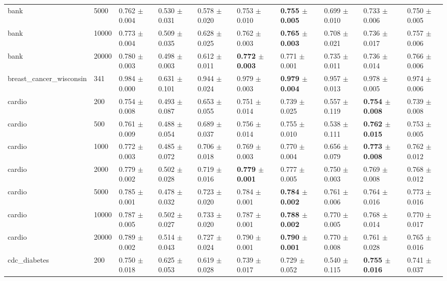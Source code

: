 \begin{table}
\begin{tabular}{llllllllll}
bank & 5000 & 0.762 $\pm$ 0.004 & 0.530 $\pm$ 0.031 & 0.578 $\pm$ 0.020 & 0.753 $\pm$ 0.010 & \textbf{0.755 $\pm$ 0.005} & 0.699 $\pm$ 0.010 & 0.733 $\pm$ 0.006 & 0.750 $\pm$ 0.005 \\
bank & 10000 & 0.773 $\pm$ 0.004 & 0.509 $\pm$ 0.035 & 0.628 $\pm$ 0.025 & 0.762 $\pm$ 0.003 & \textbf{0.765 $\pm$ 0.003} & 0.708 $\pm$ 0.021 & 0.736 $\pm$ 0.017 & 0.757 $\pm$ 0.006 \\
bank & 20000 & 0.780 $\pm$ 0.003 & 0.498 $\pm$ 0.003 & 0.612 $\pm$ 0.011 & \textbf{0.772 $\pm$ 0.003} & 0.771 $\pm$ 0.001 & 0.735 $\pm$ 0.011 & 0.736 $\pm$ 0.014 & 0.766 $\pm$ 0.006 \\
breast\_cancer\_wisconsin & 341 & 0.984 $\pm$ 0.000 & 0.631 $\pm$ 0.101 & 0.944 $\pm$ 0.024 & 0.979 $\pm$ 0.003 & \textbf{0.979 $\pm$ 0.004} & 0.957 $\pm$ 0.013 & 0.978 $\pm$ 0.005 & 0.974 $\pm$ 0.006 \\
cardio & 200 & 0.754 $\pm$ 0.008 & 0.493 $\pm$ 0.087 & 0.653 $\pm$ 0.055 & 0.751 $\pm$ 0.014 & 0.739 $\pm$ 0.025 & 0.557 $\pm$ 0.119 & \textbf{0.754 $\pm$ 0.008} & 0.739 $\pm$ 0.008 \\
cardio & 500 & 0.761 $\pm$ 0.009 & 0.488 $\pm$ 0.054 & 0.689 $\pm$ 0.037 & 0.756 $\pm$ 0.014 & 0.755 $\pm$ 0.010 & 0.538 $\pm$ 0.111 & \textbf{0.762 $\pm$ 0.015} & 0.753 $\pm$ 0.005 \\
cardio & 1000 & 0.772 $\pm$ 0.003 & 0.485 $\pm$ 0.072 & 0.706 $\pm$ 0.018 & 0.769 $\pm$ 0.003 & 0.770 $\pm$ 0.004 & 0.656 $\pm$ 0.079 & \textbf{0.773 $\pm$ 0.008} & 0.762 $\pm$ 0.012 \\
cardio & 2000 & 0.779 $\pm$ 0.002 & 0.502 $\pm$ 0.028 & 0.719 $\pm$ 0.016 & \textbf{0.779 $\pm$ 0.001} & 0.777 $\pm$ 0.005 & 0.750 $\pm$ 0.003 & 0.769 $\pm$ 0.008 & 0.768 $\pm$ 0.012 \\
cardio & 5000 & 0.785 $\pm$ 0.001 & 0.478 $\pm$ 0.032 & 0.723 $\pm$ 0.020 & 0.784 $\pm$ 0.001 & \textbf{0.784 $\pm$ 0.002} & 0.761 $\pm$ 0.006 & 0.764 $\pm$ 0.016 & 0.773 $\pm$ 0.016 \\
cardio & 10000 & 0.787 $\pm$ 0.005 & 0.502 $\pm$ 0.027 & 0.733 $\pm$ 0.020 & 0.787 $\pm$ 0.001 & \textbf{0.788 $\pm$ 0.002} & 0.770 $\pm$ 0.005 & 0.768 $\pm$ 0.014 & 0.770 $\pm$ 0.017 \\
cardio & 20000 & 0.789 $\pm$ 0.002 & 0.514 $\pm$ 0.043 & 0.727 $\pm$ 0.024 & 0.790 $\pm$ 0.001 & \textbf{0.790 $\pm$ 0.001} & 0.770 $\pm$ 0.008 & 0.761 $\pm$ 0.028 & 0.765 $\pm$ 0.016 \\
cdc\_diabetes & 200 & 0.750 $\pm$ 0.018 & 0.625 $\pm$ 0.053 & 0.619 $\pm$ 0.028 & 0.739 $\pm$ 0.017 & 0.729 $\pm$ 0.052 & 0.540 $\pm$ 0.115 & \textbf{0.755 $\pm$ 0.016} & 0.741 $\pm$ 0.037 \\

\end{tabular}
\end{table}
